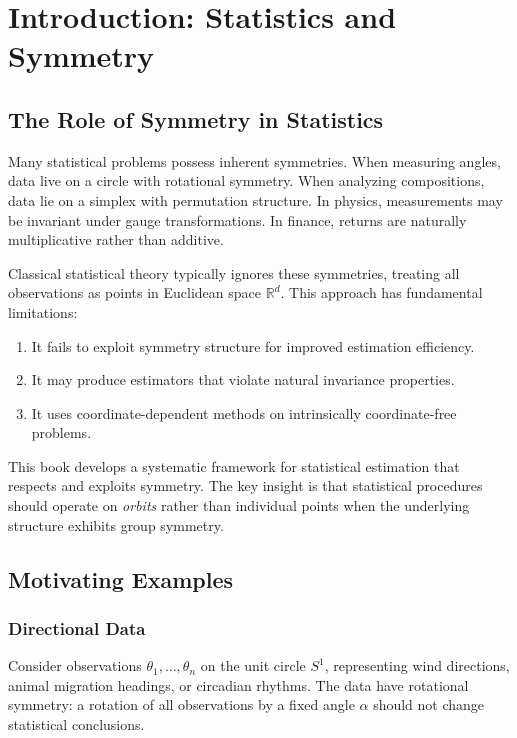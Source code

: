 \documentclass[11pt,twoside,openright]{book}
\theoremstyle{plain}
\theoremstyle{definition}
\theoremstyle{remark}
\newcommand{\Rd}{\mathbb{R}}
\begin{document}
\chapter{Introduction: Statistics and Symmetry}
\label{ch:introduction}

\section{The Role of Symmetry in Statistics}

Many statistical problems possess inherent symmetries. When measuring angles, data live on a circle with rotational symmetry. When analyzing compositions, data lie on a simplex with permutation structure. In physics, measurements may be invariant under gauge transformations. In finance, returns are naturally multiplicative rather than additive.

Classical statistical theory typically ignores these symmetries, treating all observations as points in Euclidean space $\Rd^d$. This approach has fundamental limitations:
\begin{enumerate}[label=(\roman*)]
\item It fails to exploit symmetry structure for improved estimation efficiency.
\item It may produce estimators that violate natural invariance properties.
\item It uses coordinate-dependent methods on intrinsically coordinate-free problems.
\end{enumerate}

This book develops a systematic framework for statistical estimation that respects and exploits symmetry. The key insight is that statistical procedures should operate on \emph{orbits} rather than individual points when the underlying structure exhibits group symmetry.

\section{Motivating Examples}

\subsection{Directional Data}

Consider observations $\theta_1, \ldots, \theta_n$ on the unit circle $S^1$, representing wind directions, animal migration headings, or circadian rhythms. The data have rotational symmetry: a rotation of all observations by a fixed angle $\alpha$ should not change statistical conclusions.
\end{document}
